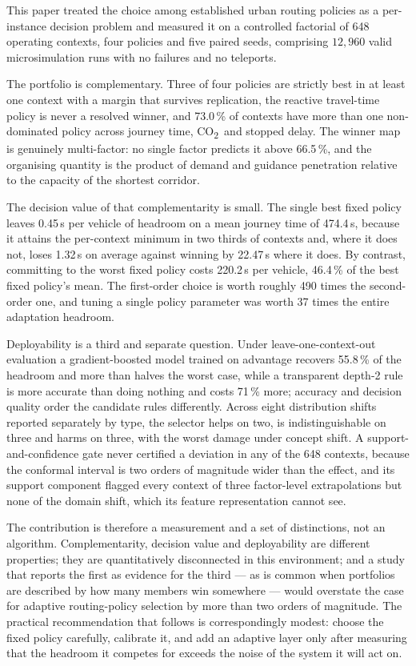 \documentclass[preprint,12pt]{elsarticle}
\newcommand{\CO}{CO\textsubscript{2}}
\begin{document}
This paper treated the choice among established urban routing policies as a
per-instance decision problem and measured it on a controlled factorial of 648
operating contexts, four policies and five paired seeds, comprising $12{,}960$
valid microsimulation runs with no failures and no teleports.

The portfolio is complementary. Three of four policies are strictly best in at
least one context with a margin that survives replication, the reactive
travel-time policy is never a resolved winner, and 73.0\,\% of contexts have more
than one non-dominated policy across journey time, \CO\ and stopped delay. The
winner map is genuinely multi-factor: no single factor predicts it above
66.5\,\%, and the organising quantity is the product of demand and guidance
penetration relative to the capacity of the shortest corridor.

The decision value of that complementarity is small. The single best fixed policy
leaves 0.45\,s per vehicle of headroom on a mean journey time of 474.4\,s, because
it attains the per-context minimum in two thirds of contexts and, where it does
not, loses 1.32\,s on average against winning by 22.47\,s where it does. By
contrast, committing to the worst fixed policy costs 220.2\,s per vehicle, 46.4\,\%
of the best fixed policy's mean. The first-order choice is worth roughly 490 times
the second-order one, and tuning a single policy parameter was worth 37 times the
entire adaptation headroom.

Deployability is a third and separate question. Under leave-one-context-out
evaluation a gradient-boosted model trained on advantage recovers 55.8\,\% of the
headroom and more than halves the worst case, while a transparent depth-2 rule is
more accurate than doing nothing and costs 71\,\% more; accuracy and decision
quality order the candidate rules differently. Across eight distribution shifts
reported separately by type, the selector helps on two, is indistinguishable on
three and harms on three, with the worst damage under concept shift. A
support-and-confidence gate never certified a deviation in any of the 648
contexts, because the conformal interval is two orders of magnitude wider than the
effect, and its support component flagged every context of three factor-level
extrapolations but none of the domain shift, which its feature representation
cannot see.

The contribution is therefore a measurement and a set of distinctions, not an
algorithm. Complementarity, decision value and deployability are different
properties; they are quantitatively disconnected in this environment; and a study
that reports the first as evidence for the third --- as is common when portfolios
are described by how many members win somewhere --- would overstate the case for
adaptive routing-policy selection by more than two orders of magnitude. The
practical recommendation that follows is correspondingly modest: choose the fixed
policy carefully, calibrate it, and add an adaptive layer only after measuring
that the headroom it competes for exceeds the noise of the system it will act on.
\end{document}
